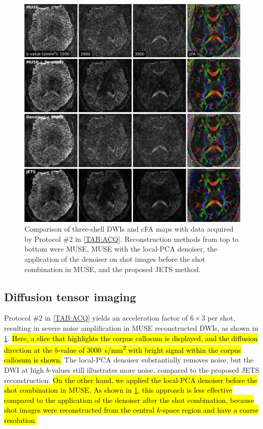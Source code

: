 \documentclass[preprint,12pt,authoryear,review]{elsarticle}
\begin{document}
    \begin{figure}
        \centering
        \includegraphics[width=\textwidth]{../figures/fig9.png}
        \caption{Comparison of three-shell DWIs and
        cFA maps with data acquired by Protocol \#2 in \cref{TAB:ACQ}.
        Reconstruction methods from top to bottom were
        MUSE, MUSE with the local-PCA denoiser,
        the application of the denoiser on shot images before the shot combination in MUSE,
        and the proposed JETS method.}
        \label{FIG:1.0mm_dti}
    \end{figure}

    \subsection{Diffusion tensor imaging}

    Protocol \#2 in \cref{TAB:ACQ} yields an acceleration factor of
    $6 \times 3$ per shot, resulting in severe noise amplification
    in MUSE reconstructed DWIs, as shown in \cref{FIG:1.0mm_dti}.
    \hl{Here, a slice that highlights the corpus callosum is displayed,
    and the diffusion direction at the $b$-value of
    \mbox{\SI{3000}{s/mm^2}} with bright signal
    within the corpus callosum is shown.}
    The local-PCA denoiser substantially removes noise,
    but the DWI at high $b$-values still illustrates more noise,
    compared to the proposed JETS reconstruction.
    \hl{On the other hand, we applied the local-PCA denoiser
    before the shot combination in MUSE.
    As shown in \mbox{\cref{FIG:1.0mm_dti}},
    this approach is less effective
    compared to the application of the denoiser after the shot combination,
    because shot images were reconstructed from the central $k$-space region
    and have a coarse resolution.}
\end{document}
